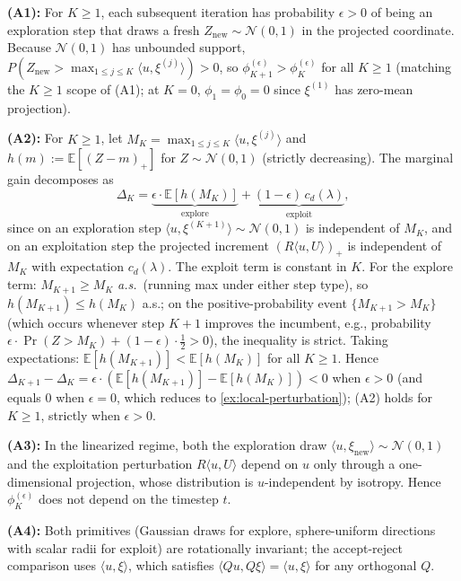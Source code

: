 \begin{example}
\textbf{(A1):} For $K \ge 1$, each subsequent iteration has probability $\epsilon > 0$ of being an exploration step that draws a fresh $Z_{\mathrm{new}} \sim \mathcal{N}(0, 1)$ in the projected coordinate. Because $\mathcal{N}(0, 1)$ has unbounded support, $P(Z_{\mathrm{new}} > \max_{1 \le j \le K} \langle u, \xi^{(j)}\rangle) > 0$, so $\phi_{K+1}^{(\epsilon)} > \phi_K^{(\epsilon)}$ for all $K \ge 1$ (matching the $K \ge 1$ scope of (A1); at $K = 0$, $\phi_1 = \phi_0 = 0$ since $\xi^{(1)}$ has zero-mean projection).

\textbf{(A2):} For $K \ge 1$, let $M_K = \max_{1 \le j \le K} \langle u, \xi^{(j)}\rangle$ and $h(m) := \mathbb{E}[(Z-m)_+]$ for $Z \sim \mathcal{N}(0,1)$ (strictly decreasing). The marginal gain decomposes as
\[
  \Delta_K = \underbrace{\epsilon \cdot \mathbb{E}[h(M_K)]}_{\text{explore}} + \underbrace{(1-\epsilon)\,c_d(\lambda)}_{\text{exploit}},
\]
since on an exploration step $\langle u, \xi^{(K+1)}\rangle \sim \mathcal{N}(0,1)$ is independent of $M_K$, and on an exploitation step the projected increment $(R\langle u, U\rangle)_+$ is independent of $M_K$ with expectation $c_d(\lambda)$. The exploit term is constant in $K$. For the explore term: $M_{K+1} \ge M_K$ \emph{a.s.}\ (running max under either step type), so $h(M_{K+1}) \le h(M_K)$ a.s.; on the positive-probability event $\{M_{K+1} > M_K\}$ (which occurs whenever step $K+1$ improves the incumbent, e.g., probability $\epsilon \cdot \Pr(Z > M_K) + (1-\epsilon) \cdot \frac12 > 0$), the inequality is strict. Taking expectations: $\mathbb{E}[h(M_{K+1})] < \mathbb{E}[h(M_K)]$ for all $K \ge 1$. Hence $\Delta_{K+1} - \Delta_K = \epsilon \cdot (\mathbb{E}[h(M_{K+1})] - \mathbb{E}[h(M_K)]) < 0$ when $\epsilon > 0$ (and equals $0$ when $\epsilon = 0$, which reduces to \cref{ex:local-perturbation}); (A2) holds for $K \ge 1$, strictly when $\epsilon > 0$.

\textbf{(A3):} In the linearized regime, both the exploration draw $\langle u, \xi_{\mathrm{new}}\rangle \sim \mathcal{N}(0, 1)$ and the exploitation perturbation $R\langle u, U\rangle$ depend on $u$ only through a one-dimensional projection, whose distribution is $u$-independent by isotropy. Hence $\phi_K^{(\epsilon)}$ does not depend on the timestep $t$.

\textbf{(A4):} Both primitives (Gaussian draws for explore, sphere-uniform directions with scalar radii for exploit) are rotationally invariant; the accept-reject comparison uses $\langle u, \xi\rangle$, which satisfies $\langle Qu, Q\xi\rangle = \langle u, \xi\rangle$ for any orthogonal $Q$.
\end{example}
